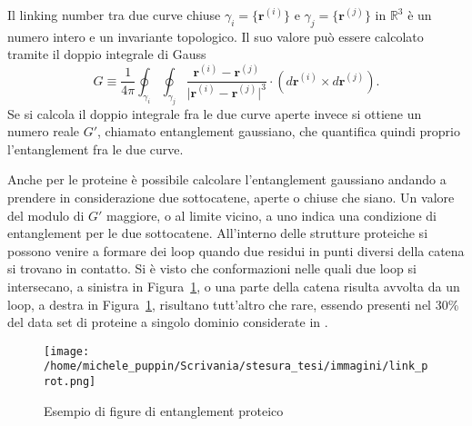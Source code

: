 Il linking number tra due curve chiuse $ \gamma_i = \{\mathbf{r}^{(i)}\} $ e $ \gamma_j = \{\mathbf{r}^{(j)}\} $ in $ \mathbb{R}^3 $ è un numero intero e un invariante topologico.
Il suo valore può essere calcolato tramite il doppio integrale di Gauss
\begin{equation}
G \equiv \frac{1}{4 \pi} \oint_{\gamma_i} \oint_{\gamma_j} \frac{\mathbf{r}^{(i)} - \mathbf{r}^{(j)}}{ \lvert \mathbf{r}^{(i)} - \mathbf{r}^{(j)} \rvert^3} 
\cdot (d\mathbf{r}^{(i)} \times d\mathbf{r}^{(j)}).
\label{eq:link}
\end{equation} 
Se si calcola il doppio integrale fra le due curve aperte invece si ottiene un numero reale $ G' $, chiamato entanglement gaussiano, che quantifica quindi proprio l'entanglement fra le due curve. \cite{Baiesi_2017}

Anche per le proteine è possibile calcolare l'entanglement gaussiano andando a prendere in considerazione due sottocatene, aperte o chiuse che siano. Un valore del modulo di $ G' $ maggiore, o al limite vicino, a uno indica una condizione di entanglement per le due sottocatene. All'interno delle strutture proteiche si possono venire a formare dei loop quando due residui in punti diversi della catena si trovano in contatto. Si è visto che conformazioni nelle quali due loop si intersecano, a sinistra in Figura~\ref{fig:link_prot}, o una parte della catena risulta avvolta da un loop, a destra in Figura~\ref{fig:link_prot}, risultano tutt'altro che rare, essendo presenti nel 30\% del data set di proteine a singolo dominio considerate in \cite{preprint}.
\begin{figure}[h]
	\centering
	\texttt{[image: /home/michele\_puppin/Scrivania/stesura\_tesi/immagini/link\_prot.png]}
	\caption{Esempio di figure di entanglement proteico}
	\label{fig:link_prot}
\end{figure}

